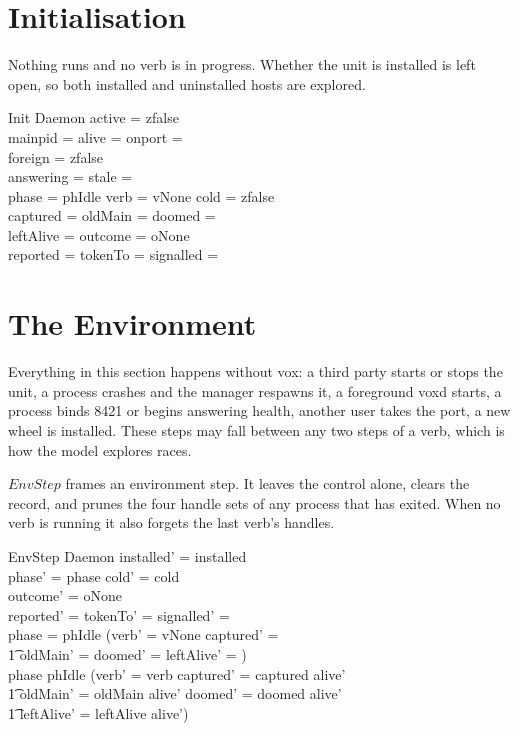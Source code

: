 \documentclass[a4paper,10pt,fleqn]{article}
\begin{document}
\section{Initialisation}

Nothing runs and no verb is in progress. Whether the unit is installed is left
open, so both installed and uninstalled hosts are explored.

\begin{schema}{Init}
  Daemon
\where
  active = zfalse \\
  mainpid = \emptyset \land alive = \emptyset \land onport = \emptyset \\
  foreign = zfalse \\
  answering = \emptyset \land stale = \emptyset \\
  phase = phIdle \land verb = vNone \land cold = zfalse \\
  captured = \emptyset \land oldMain = \emptyset \land doomed = \emptyset \\
  leftAlive = \emptyset \land outcome = oNone \\
  reported = \emptyset \land tokenTo = \emptyset \land signalled = \emptyset
\end{schema}

\section{The Environment}

Everything in this section happens without vox: a third party starts or
stops the unit, a process crashes and the manager respawns it, a foreground
voxd starts, a process binds 8421 or begins answering health, another user
takes the port, a new wheel is installed. These steps may fall between any two
steps of a verb, which is how the model explores races.

$EnvStep$ frames an environment step. It leaves the control alone, clears the
record, and prunes the four handle sets of any process that has exited. When
no verb is running it also forgets the last verb's handles.

\begin{schema}{EnvStep}
  \Delta Daemon
\where
  installed' = installed \\
  phase' = phase \land cold' = cold \\
  outcome' = oNone \\
  reported' = \emptyset \land tokenTo' = \emptyset \land
    signalled' = \emptyset \\
  phase = phIdle \implies (verb' = vNone \land captured' = \emptyset \land \\
  \t1 oldMain' = \emptyset \land doomed' = \emptyset \land
    leftAlive' = \emptyset) \\
  phase \neq phIdle \implies (verb' = verb \land
    captured' = captured \cap alive' \land \\
  \t1 oldMain' = oldMain \cap alive' \land doomed' = doomed \cap alive'
    \land \\
  \t1 leftAlive' = leftAlive \cap alive')
\end{schema}
\end{document}
